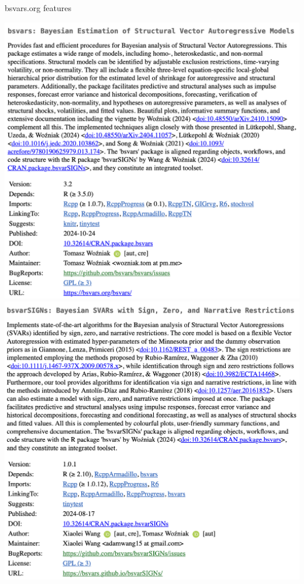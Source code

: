 \documentclass[aspectratio=1610,notes,blackandwhite,mathsans,usenames,dvipsnames]{beamer}
\begin{document}
	
	\begin{frame}{\huge bsvars.org features}
		\Large
		
		\includegraphics[scale=0.28]{bsvars_cran}
		\includegraphics[scale=0.28]{bsvarSIGNs_cran}
		
	\end{frame}
	
\end{document}
